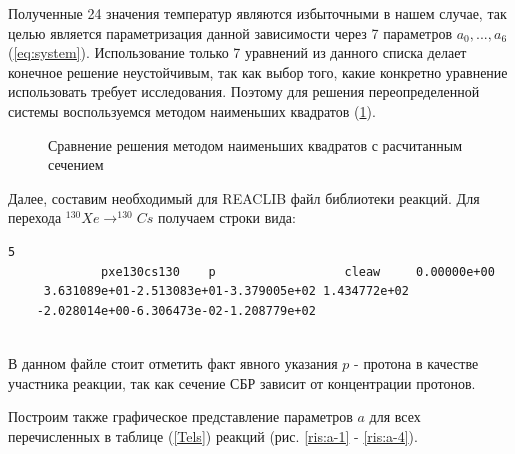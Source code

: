 \documentclass[14pt, a4paper]{article}
\numberwithin{figure}{section}
\numberwithin{equation}{section}
\begin{document}
Полученные 24 значения температур являются избыточными в нашем случае, так целью является параметризация данной зависимости через 7 параметров $a_0, ..., a_6$ (\ref{eq:system}). Использование только 7 уравнений из данного списка делает конечное решение неустойчивым, так как выбор того, какие конкретно уравнение использовать требует исследования. Поэтому для решения переопределенной системы воспользуемся методом наименьших квадратов (\ref{ris:2}).

\begin{figure}[ht]
	\caption{Сравнение решения методом наименьших квадратов с расчитанным сечением}
	\label{ris:2}
\end{figure}

Далее, составим необходимый для REACLIB файл библиотеки реакций. Для перехода $^{130}Xe \to ^{130}Cs$ получаем строки вида: 

\begin{lstlisting}[label={lst:label}]
	5
	         pxe130cs130    p                  cleaw     0.00000e+00          
	 3.631089e+01-2.513083e+01-3.379005e+02 1.434772e+02                      
	-2.028014e+00-6.306473e-02-1.208779e+02                                   
	
\end{lstlisting}

В данном файле стоит отметить факт явного указания $p$ - протона в качестве участника реакции, так как сечение СБР зависит от концентрации протонов. 

Построим также графическое представление параметров $a$ для всех перечисленных в таблице (\ref{Tels}) реакций  (рис. \ref{ris:a-1} - \ref{ris:a-4}).
\end{document}
